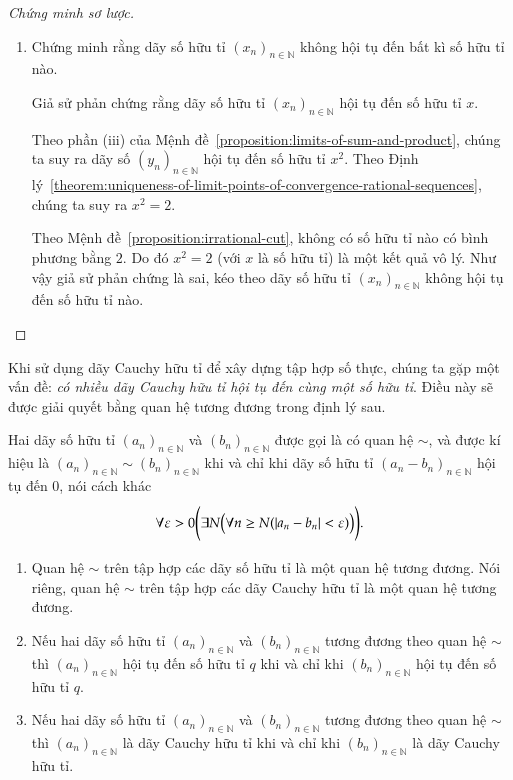 \begin{proof}[Chứng minh sơ lược]
\begin{enumerate}[label={\textbf{Bước \arabic*.}},itemindent=1cm]
              Theo định nghĩa dãy số hội tụ, dãy số hữu tỉ ${(y_{n})}_{n\in\mathbb{N}}$ hội tụ đến $2$.
        \item Chứng minh rằng dãy số hữu tỉ ${(x_{n})}_{n\in\mathbb{N}}$ không hội tụ đến bất kì số hữu tỉ nào.

              Giả sử phản chứng rằng dãy số hữu tỉ ${(x_{n})}_{n\in\mathbb{N}}$ hội tụ    đến số hữu tỉ $x$.

              Theo phần (iii) của Mệnh đề~\ref{proposition:limits-of-sum-and-product}, chúng ta suy ra dãy số ${(y_{n})}_{n\in\mathbb{N}}$ hội tụ đến số hữu tỉ $x^{2}$. Theo Định lý~\ref{theorem:uniqueness-of-limit-points-of-convergence-rational-sequences}, chúng ta suy ra $x^{2} = 2$.

              Theo Mệnh đề~\ref{proposition:irrational-cut}, không có số hữu tỉ nào có bình phương bằng $2$. Do đó $x^{2} = 2$ (với $x$ là số hữu tỉ) là một kết quả vô lý. Như vậy giả sử phản chứng là sai, kéo theo dãy số hữu tỉ ${(x_{n})}_{n\in\mathbb{N}}$ không hội tụ đến số hữu tỉ nào.
    \end{enumerate}
\end{proof}

Khi sử dụng dãy Cauchy hữu tỉ để xây dựng tập hợp số thực, chúng ta gặp một vấn đề: \textit{có nhiều dãy Cauchy hữu tỉ hội tụ đến cùng một số hữu tỉ}. Điều này sẽ được giải quyết bằng quan hệ tương đương trong định lý sau.

\begin{theorem}
    Hai dãy số hữu tỉ ${(a_{n})}_{n\in\mathbb{N}}$ và ${(b_{n})}_{n\in\mathbb{N}}$ được gọi là có quan hệ $\sim$, và được kí hiệu là ${(a_{n})}_{n\in\mathbb{N}} \sim {(b_{n})}_{n\in\mathbb{N}}$ khi và chỉ khi dãy số hữu tỉ ${(a_{n} - b_{n})}_{n\in\mathbb{N}}$ hội tụ đến $0$, nói cách khác
    \[
        \forall\varepsilon > 0\Biggl( \exists N \Bigl( \forall n\geq N ( \left\vert{a_{n} - b_{n}}\right\vert < \varepsilon ) \Bigr) \Biggr).
    \]
    \begin{enumerate}[label={(\roman*)},itemsep=0pt]
        \item Quan hệ $\sim$ trên tập hợp các dãy số hữu tỉ là một quan hệ tương đương. Nói riêng, quan hệ $\sim$ trên tập hợp các dãy Cauchy hữu tỉ là một quan hệ tương đương.
        \item Nếu hai dãy số hữu tỉ ${(a_{n})}_{n\in\mathbb{N}}$ và ${(b_{n})}_{n\in\mathbb{N}}$ tương đương theo quan hệ $\sim$ thì ${(a_{n})}_{n\in\mathbb{N}}$ hội tụ đến số hữu tỉ $q$ khi và chỉ khi ${(b_{n})}_{n\in\mathbb{N}}$ hội tụ đến số hữu tỉ $q$.
        \item Nếu hai dãy số hữu tỉ ${(a_{n})}_{n\in\mathbb{N}}$ và ${(b_{n})}_{n\in\mathbb{N}}$ tương đương theo quan hệ $\sim$ thì ${(a_{n})}_{n\in\mathbb{N}}$ là dãy Cauchy hữu tỉ khi và chỉ khi ${(b_{n})}_{n\in\mathbb{N}}$ là dãy Cauchy hữu tỉ.
    \end{enumerate}
\end{theorem}

